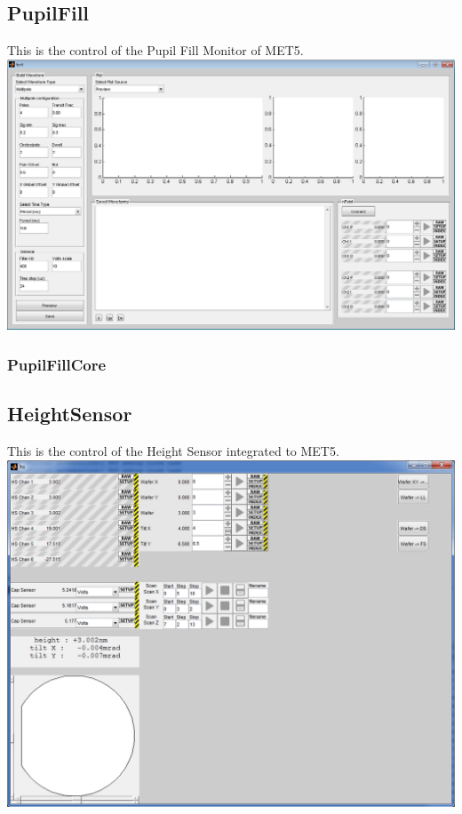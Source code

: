 \documentclass[10pt,letter,twoside]{report}
\begin{document}
\subsection{PupilFill}
This is the control of the Pupil Fill Monitor of MET5.\\
\includegraphics[scale=0.33]{img/met5gui-PupilFill.png}
	\subsubsection{PupilFillCore}

\subsection{HeightSensor}
This is the control of the Height Sensor integrated to MET5.\\
\includegraphics[scale=0.33]{img/met5gui-heightSensor.png}
\end{document}
